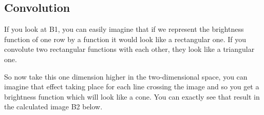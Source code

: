 \documentclass[a4paper,12pt]{article}
\begin{document}
	\subsection{Convolution}
	
	If you look at B1, you can easily imagine that if we represent the brightness function of one row by a function it would look like a rectangular one. If you convolute two rectangular functions with each other, they look like a triangular one.
	
	So now take this one dimension higher in the two-dimensional space, you can imagine that effect taking place for each line crossing the image and so you get a brightness function which will look like a cone. You can exactly see that result in the calculated image B2 below.
	
	\vspace{6pt}
	\noindent
\end{document}
